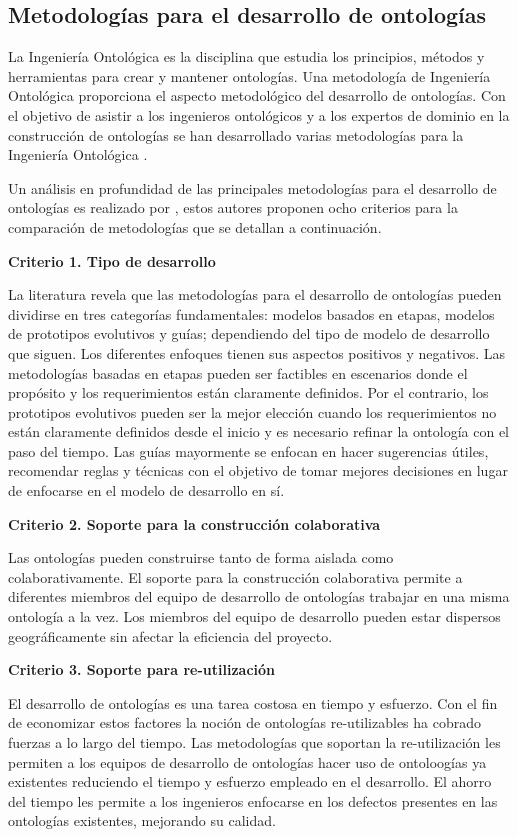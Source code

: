 \subsection{Metodologías para el desarrollo de ontologías}

La Ingeniería Ontológica es la disciplina que estudia los principios, métodos y herramientas para crear y mantener ontologías. Una metodología de Ingeniería Ontológica proporciona el aspecto metodológico del desarrollo de ontologías. Con el objetivo de asistir a los ingenieros ontológicos y a los expertos de dominio en la construcción de ontologías se han desarrollado varias metodologías para la Ingeniería Ontológica \citep{Iqbal2013}.

Un análisis en profundidad de las principales metodologías para el desarrollo de ontologías es realizado por \cite{Iqbal2013}, estos autores proponen ocho criterios para la comparación de metodologías que se detallan a continuación.

\textbf{Criterio 1. Tipo de desarrollo}

La literatura revela que las metodologías para el desarrollo de ontologías pueden dividirse en tres categorías fundamentales: modelos basados en etapas, modelos de prototipos evolutivos y guías; dependiendo del tipo de modelo de desarrollo que siguen. Los diferentes enfoques tienen sus aspectos positivos y negativos. Las metodologías basadas en etapas pueden ser factibles en escenarios donde el propósito y los requerimientos están claramente definidos. Por el contrario, los prototipos evolutivos pueden ser la mejor elección cuando los requerimientos no están claramente definidos desde el inicio y es necesario refinar la ontología con el paso del tiempo. Las guías mayormente se enfocan en hacer sugerencias útiles, recomendar reglas y técnicas con el objetivo de tomar mejores decisiones en lugar de enfocarse en el modelo de desarrollo en sí.

\textbf{Criterio 2. Soporte para la construcción colaborativa}

Las ontologías pueden construirse tanto de forma aislada como colaborativamente. El soporte para la construcción colaborativa permite a diferentes miembros del equipo de desarrollo de ontologías trabajar en una misma ontología a la vez. Los miembros del equipo de desarrollo pueden estar dispersos geográficamente sin afectar la eficiencia del proyecto. 

\textbf{Criterio 3. Soporte para re-utilización}

El desarrollo de ontologías es una tarea costosa en tiempo y esfuerzo. Con el fin de economizar estos factores la noción de ontologías re-utilizables ha cobrado fuerzas a lo largo del tiempo. Las metodologías que soportan la re-utilización les permiten a los equipos de desarrollo de ontologías hacer uso de ontoloogías ya existentes reduciendo el tiempo y esfuerzo empleado en el desarrollo. El ahorro del tiempo les permite a los ingenieros enfocarse en los defectos presentes en las ontologías existentes, mejorando su calidad. 

